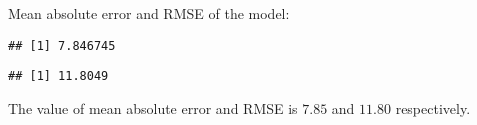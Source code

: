 \documentclass[
]{article}
\newenvironment{Shaded}{\begin{snugshade}}{\end{snugshade}}
\newcommand{\CommentTok}[1]{\textcolor[rgb]{0.56,0.35,0.01}{\textit{#1}}}
\newcommand{\FunctionTok}[1]{\textcolor[rgb]{0.00,0.00,0.00}{#1}}
\newcommand{\NormalTok}[1]{#1}
\newcommand{\SpecialCharTok}[1]{\textcolor[rgb]{0.00,0.00,0.00}{#1}}
\begin{document}
Mean absolute error and RMSE of the model:

\begin{Shaded}
\end{Shaded}

\begin{verbatim}
## [1] 7.846745
\end{verbatim}

\begin{Shaded}
\end{Shaded}

\begin{verbatim}
## [1] 11.8049
\end{verbatim}

The value of mean absolute error and RMSE is \(7.85\) and \(11.80\)
respectively.
\end{document}
